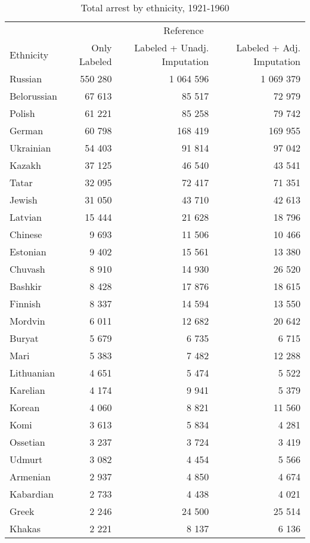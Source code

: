 \begin{table}[!h]

\caption{\label{tab:total_arrests_by_ethnicity}Total arrest by ethnicity, 1921-1960}
\centering
\fontsize{8}{10}\selectfont
\begin{tabular}{lrrr}
\toprule
\multicolumn{1}{c}{ } & \multicolumn{3}{c}{Reference} \\
\cmidrule(l{2pt}r{2pt}){2-4}
Ethnicity & Only Labeled & Labeled + Unadj. Imputation & Labeled + Adj. Imputation\\
\midrule
Russian & 550 280 & 1 064 596 & 1 069 379\\
Belorussian & 67 613 & 85 517 & 72 979\\
Polish & 61 221 & 85 258 & 79 742\\
German & 60 798 & 168 419 & 169 955\\
Ukrainian & 54 403 & 91 814 & 97 042\\
Kazakh & 37 125 & 46 540 & 43 541\\
Tatar & 32 095 & 72 417 & 71 351\\
Jewish & 31 050 & 43 710 & 42 613\\
Latvian & 15 444 & 21 628 & 18 796\\
Chinese & 9 693 & 11 506 & 10 466\\
Estonian & 9 402 & 15 561 & 13 380\\
Chuvash & 8 910 & 14 930 & 26 520\\
Bashkir & 8 428 & 17 876 & 18 615\\
Finnish & 8 337 & 14 594 & 13 550\\
Mordvin & 6 011 & 12 682 & 20 642\\
Buryat & 5 679 & 6 735 & 6 715\\
Mari & 5 383 & 7 482 & 12 288\\
Lithuanian & 4 651 & 5 474 & 5 522\\
Karelian & 4 174 & 9 941 & 5 379\\
Korean & 4 060 & 8 821 & 11 560\\
Komi & 3 613 & 5 834 & 4 281\\
Ossetian & 3 237 & 3 724 & 3 419\\
Udmurt & 3 082 & 4 454 & 5 566\\
Armenian & 2 937 & 4 850 & 4 674\\
Kabardian & 2 733 & 4 438 & 4 021\\
Greek & 2 246 & 24 500 & 25 514\\
Khakas & 2 221 & 8 137 & 6 136\\

\end{tabular}
\end{table}
